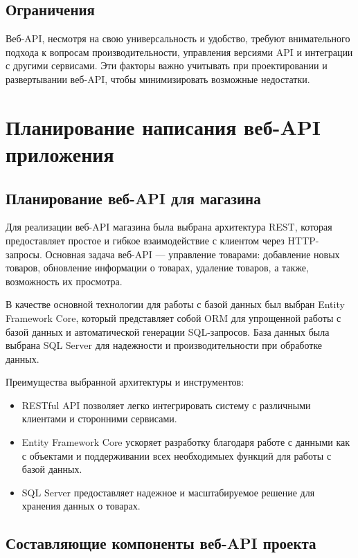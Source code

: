 \documentclass[a4paper,12pt]{report}
\begin{document}
\subsection{Ограничения}

Веб-\ac{API}, несмотря на свою универсальность и удобство, требуют внимательного подхода к вопросам производительности, 
управления версиями \ac{API} и интеграции с другими сервисами. Эти факторы важно учитывать 
при проектировании и развертывании веб-\ac{API}, чтобы минимизировать возможные недостатки.

\section{Планирование написания веб-\ac{API} приложения}

\subsection{Планирование веб-\ac{API} для магазина}

Для реализации веб-\ac{API} магазина была выбрана архитектура \ac{REST}, которая предоставляет простое и гибкое взаимодействие с клиентом через \ac{HTTP}-запросы. 
Основная задача веб-\ac{API} --- управление товарами: добавление новых товаров, обновление информации о товарах, удаление товаров, а также, возможность их просмотра.

В качестве основной технологии для работы с базой данных был выбран Entity Framework Core, который представляет собой \ac{ORM} для упрощенной работы с базой данных 
и автоматической генерации \ac{SQL}-запросов. База данных была выбрана \ac{SQL} Server для надежности и производительности при обработке данных.

Преимущества выбранной архитектуры и инструментов:
\begin{itemize}
  \item
      \ac{REST}ful \ac{API} позволяет легко интегрировать систему с различными клиентами и сторонними сервисами.
  \item 
      Entity Framework Core ускоряет разработку благодаря работе с данными как с объектами и поддерживании всех необходимыех функций для работы с базой данных.
  \item
      \ac{SQL} Server предоставляет надежное и масштабируемое решение для хранения данных о товарах.
\end{itemize}

\subsection{Составляющие компоненты веб-\ac{API} проекта}
\end{document}
